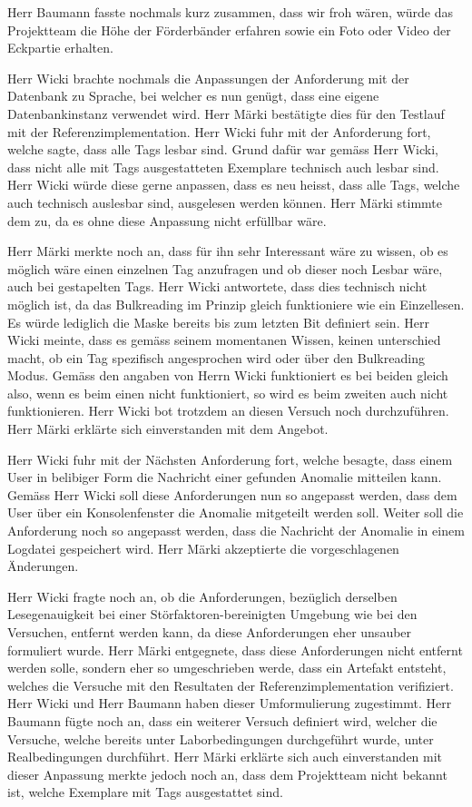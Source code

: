 \documentclass[parskip=full, a4paper]{scrreprt}
\begin{document}
Herr Baumann fasste nochmals kurz zusammen, dass wir froh wären, würde das Projektteam die Höhe der Förderbänder erfahren sowie ein Foto oder Video der Eckpartie erhalten.

Herr Wicki brachte nochmals die Anpassungen der Anforderung mit der Datenbank zu Sprache, bei welcher es nun genügt, dass eine eigene Datenbankinstanz verwendet wird. Herr Märki bestätigte dies für den Testlauf mit der Referenzimplementation. Herr Wicki fuhr mit der Anforderung fort, welche sagte, dass alle Tags lesbar sind. Grund dafür war gemäss Herr Wicki, dass nicht alle mit Tags ausgestatteten Exemplare technisch auch lesbar sind. Herr Wicki würde diese gerne anpassen, dass es neu heisst, dass alle Tags, welche auch technisch auslesbar sind, ausgelesen werden können. Herr Märki stimmte dem zu, da es ohne diese Anpassung nicht erfüllbar wäre.

Herr Märki merkte noch an, dass für ihn sehr Interessant wäre zu wissen, ob es möglich wäre einen einzelnen Tag anzufragen und ob dieser noch Lesbar wäre, auch bei gestapelten Tags. Herr Wicki antwortete, dass dies technisch nicht möglich ist, da das Bulkreading im Prinzip gleich funktioniere wie ein Einzellesen. Es würde lediglich die Maske bereits bis zum letzten Bit definiert sein. Herr Wicki meinte, dass es gemäss seinem momentanen Wissen, keinen unterschied macht, ob ein Tag spezifisch angesprochen wird oder über den Bulkreading Modus. Gemäss den angaben von Herrn Wicki funktioniert es bei beiden gleich also, wenn es beim einen nicht funktioniert, so wird es beim zweiten auch nicht funktionieren. Herr Wicki bot trotzdem an diesen Versuch noch durchzuführen. Herr Märki erklärte sich einverstanden mit dem Angebot.

Herr Wicki fuhr mit der Nächsten Anforderung fort, welche besagte, dass einem User in belibiger Form die Nachricht einer gefunden Anomalie mitteilen kann. Gemäss Herr Wicki soll diese Anforderungen nun so angepasst werden, dass dem User über ein Konsolenfenster die Anomalie mitgeteilt werden soll. Weiter soll die Anforderung noch so angepasst werden, dass die Nachricht der Anomalie in einem Logdatei gespeichert wird. Herr Märki akzeptierte die vorgeschlagenen Änderungen.

Herr Wicki fragte noch an, ob die Anforderungen, bezüglich derselben Lesegenauigkeit bei einer Störfaktoren-bereinigten Umgebung wie bei den Versuchen, entfernt werden kann, da diese Anforderungen eher unsauber formuliert wurde. Herr Märki entgegnete, dass diese Anforderungen nicht entfernt werden solle, sondern eher so umgeschrieben werde, dass ein Artefakt entsteht, welches die Versuche mit den Resultaten der Referenzimplementation verifiziert. Herr Wicki und Herr Baumann haben dieser Umformulierung zugestimmt.
Herr Baumann fügte noch an, dass ein weiterer Versuch definiert wird, welcher die Versuche, welche bereits unter Laborbedingungen durchgeführt wurde, unter Realbedingungen durchführt. Herr Märki erklärte sich auch einverstanden mit dieser Anpassung merkte jedoch noch an, dass dem Projektteam nicht bekannt ist, welche Exemplare mit Tags ausgestattet sind.
\end{document}
